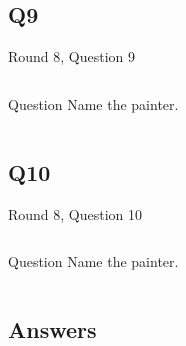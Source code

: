 \documentclass[11pt]{beamer}
\begin{document}
\subsection*{Q9}
\begin{frame}[t]{Round 8, Question 9}
\vspace{0.5em}
\begin{columns}[T,totalwidth=\linewidth]
\begin{column}{0.25\linewidth}
\begin{block}{Question}
Name the painter.
\end{block}
\end{column}
\begin{column}{0.7\linewidth}
\begin{center}
\texttt{[image: \{Images/guernica]}.jpg}
\end{center}
\end{column}
\end{columns}
\end{frame}
    

\subsection*{Q10}
\begin{frame}[t]{Round 8, Question 10}
\vspace{0.5em}
\begin{columns}[T,totalwidth=\linewidth]
\begin{column}{0.25\linewidth}
\begin{block}{Question}
Name the painter.
\end{block}
\end{column}
\begin{column}{0.7\linewidth}
\begin{center}
\texttt{[image: \{Images/rothko]}.jpg}
\end{center}
\end{column}
\end{columns}
\end{frame}
    
\subsection{Answers}
\end{document}
